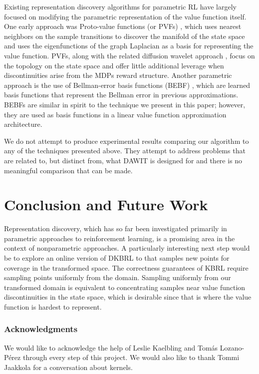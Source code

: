 \documentclass{article} %
\begin{document}
Existing representation discovery algorithms for parametric RL have largely focused on
modifying the parametric representation of the value function itself. One early
approach was Proto-value functions (or PVFs) \cite{pvf}, which uses
nearest neighbors on the sample transitions to discover the manifold of the state space
and uses the eigenfunctions of the graph Laplacian as a basis for representing the value
function.
PVFs, along with the related diffusion wavelet approach \cite{wavelets},
focus on the topology on the state space and offer little additional leverage
when discontinuities arise from the MDPs reward structure.
Another parametric approach is the use of Bellman-error basis functions (BEBF) \cite{parr},
which are learned basis functions that represent 
the Bellman error in previous approximations.
BEBFs are similar in spirit to the technique we present in this paper; however,
they are used as basis functions in a linear value function approximation architecture.

We do not attempt to produce experimental results comparing our algorithm to any
of the techniques presented above.
They attempt to address problems that are related to, but distinct from,
what DAWIT is designed for and there is no meaningful comparison that can be made.

\section{Conclusion and Future Work}

Representation discovery, which has so far been investigated primarily in parametric
approaches to reinforcement learning,  is a promising area in the context of
nonparametric approaches.
A particularly interesting next step would be to explore
an online version of DKBRL to that samples new points for coverage
in the transformed space.
The correctness guarantees of KBRL require sampling points uniformly from the domain.
Sampling uniformly from our transformed domain is equivalent to concentrating samples
near value function discontinuities in the state space, which is desirable since that is where
the value function is hardest to represent.

\subsubsection*{Acknowledgments}

We would like to acknowledge the help of Leslie Kaelbling and
Tom\'{a}s Lozano-P\'{e}rez through every step of this project.
We would also like to thank Tommi Jaakkola for a conversation about
kernels.

\small{


}

\appendix

%

%
\end{document}
